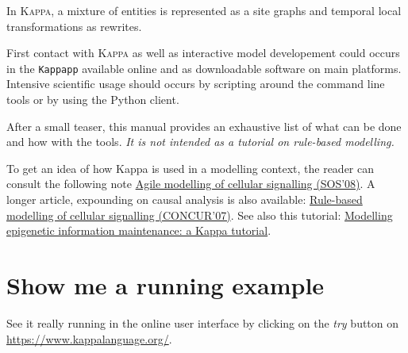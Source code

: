 \documentclass[11pt]{book}
\def\Kappa{\textsc{Kappa}}
\begin{document}

In \Kappa{}, a mixture of entities is represented as a site graphs and
temporal local transformations as rewrites.

First contact with \Kappa{} as well as interactive model developement
could occurs in the \texttt{Kappapp} available online and as
downloadable software on main platforms. Intensive scientific usage
should occurs by scripting around the command line tools or by using the
Python client.


After a small teaser, this manual provides an exhaustive list of what
can be done and how with the tools. \emph{It is not intended as a
  tutorial on rule-based modelling.}


To get an idea of how Kappa is used in a modelling context, the reader
can consult the following note
\href{http://www.research.ed.ac.uk/portal/files/16869853/Agile_Modelling_of_Cellular_Signalling_Invited_Paper_.pdf}{Agile
  modelling of cellular signalling (SOS'08)}. A longer article,
expounding on causal analysis is also available:
\href{http://fontana.med.harvard.edu/www/Documents/WF/Papers/signaling.causality.pdf}{Rule-based
  modelling of cellular signalling (CONCUR'07)}. See also this
tutorial:
\href{https://hal.archives-ouvertes.fr/hal-00692430}{Modelling
  epigenetic information maintenance: a Kappa tutorial}.


\section{Show me a running example}\label{chap:abc}
See it really running in the online user interface by clicking on the
\emph{try} button on \url{https://www.kappalanguage.org/}.

\end{document}

